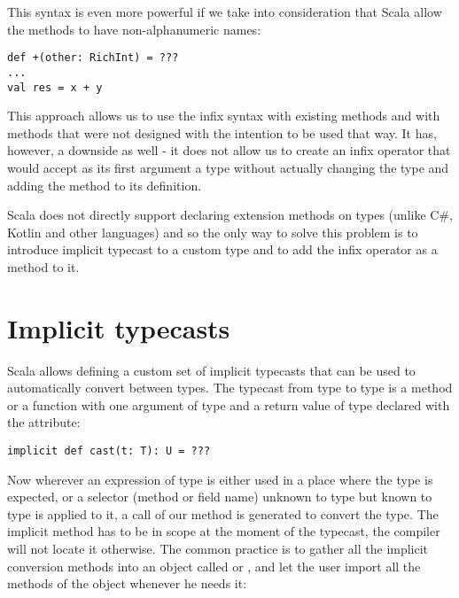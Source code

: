 This syntax is even more powerful if we take into consideration that Scala allow the methods to have non-alphanumeric names:

\lstset{style=Scala}
\begin{lstlisting}
def +(other: RichInt) = ???
...
val res = x + y
\end{lstlisting}

This approach allows us to use the infix syntax with existing methods and with methods that were not designed with the intention to be used that way. It has, however, a downside as well - it does not allow us to create an infix operator that would accept as its first argument a type without actually changing the type and adding the method to its definition. 

Scala does not directly support declaring extension methods on types (unlike C\#, Kotlin and other languages) and so the only way to solve this problem is to introduce implicit typecast to a custom type and to add the infix operator as a method to it.

\section{Implicit typecasts}
\label{sec:implicits}

Scala allows defining a custom set of implicit typecasts that can be used to automatically convert between types. The typecast from type  to type  is a method or a function with one argument of type  and a return value of type  declared with the  attribute:

\lstset{style=Scala}
\begin{lstlisting}
implicit def cast(t: T): U = ???
\end{lstlisting}

Now wherever an expression of type  is either used in a place where the type  is expected, or a selector (method or field name) unknown to type  but known to type  is applied to it, a call of our  method is generated to convert the type. The implicit method has to be in scope at the moment of the typecast, the compiler will not locate it otherwise. The common practice is to gather all the implicit conversion methods into an object called  or , and let the user import all the methods of the object whenever he needs it:

